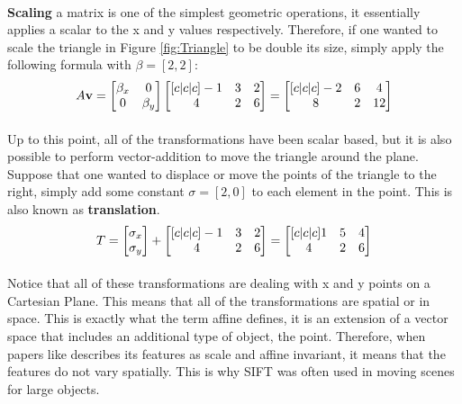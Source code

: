 \documentclass[11pt]{article}
\begin{document}
\paragraph[Scale]{} \textbf{Scaling} a matrix is one of the simplest geometric operations, it essentially applies a scalar to the x and y values respectively. Therefore, if one wanted to scale the triangle in Figure \ref{fig:Triangle} to be double its size, simply apply the following formula with $\beta=[2,2]$:
{\small 
	\begin{equation}\label{equ:Scale}
	\centering
	A\textbf{v}=
	\begin{bmatrix}
	\beta_{x} & 0\\
	0 & \beta_{y} 
	\end{bmatrix}
	\begin{bmatrix}[c|c|c]
	-1 & 3 & 2\\
	 4 & 2 & 6
	\end{bmatrix}
	=
	\begin{bmatrix}[c|c|c]
	-2 & 6 & 4\\
	 8 & 2 & 12
	\end{bmatrix}
	\end{equation}
}

\paragraph[Translations]{} Up to this point, all of the transformations have been scalar based, but it is also possible to perform vector-addition to move the triangle around the plane. Suppose that one wanted to displace or move the points of the triangle to the right, simply add some constant $\sigma=[2,0]$ to each element in the point. This is also known as \textbf{translation}.
{\small 
	\begin{equation}\label{equ:Translation}
	\centering
	T=
	\begin{bmatrix}
	\sigma_{x}\\
	\sigma_{y}
	\end{bmatrix}
	+
	\begin{bmatrix}[c|c|c]
	-1 & 3 & 2\\
	 4 & 2 & 6
	\end{bmatrix}
	=
	\begin{bmatrix}[c|c|c]
	1 & 5 & 4\\
	4 & 2 & 6
	\end{bmatrix}
	\end{equation}
}
\paragraph[Affine Transforms]{}
Notice that all of these transformations are dealing with x and y points on a Cartesian Plane. This means that all of the transformations are spatial or in space. This is exactly what the term affine defines, it is an extension of a vector space that includes an additional type of object, the point. Therefore, when papers like \cite[Distinctive Image Features from Scale-Invariant Keypoints][]{lowe_distinctive_2004} describes its features as scale and affine invariant, it means that the features do not vary spatially. This is why SIFT was often used in moving scenes for large objects.
\end{document}
